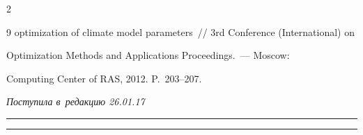 \begin{multicols}{2}
{{\begin{thebibliography}{9}
optimization of climate model parameters~//  3rd Conference (International) on 


Optimization Methods and Applications Proceedings.~--- Moscow: 


Computing Center of RAS, 2012. P.~203--207.


 \end{thebibliography}





 }


 }





\end{multicols}





\vspace*{-3pt}





\hfill{\small\textit{Поступила в~редакцию 26.01.17}}





\vspace*{10pt}















\hrule





\vspace*{2pt}





\hrule





\vspace*{8pt}








\def\tit{APPLICATION OF~QUASI-RANDOM ENSEMBLE CALCULATIONS 


FOR~DETERMINATION OF~CLIMATE MODEL OPTIMAL PARAMETERS}





